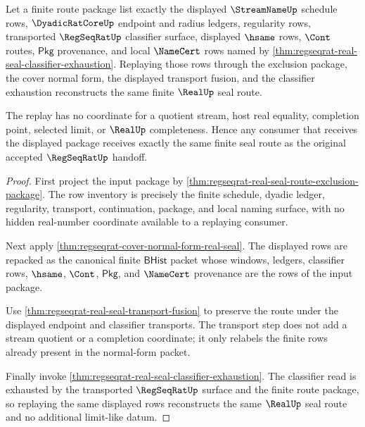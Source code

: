 \begin{theorem}
\label{thm:regseqrat-real-seal-route-replay}
Let a finite route package list exactly the displayed $\StreamNameUp$ schedule
rows, $\DyadicRatCoreUp$ endpoint and radius ledgers, regularity rows,
transported $\RegSeqRatUp$ classifier surface, displayed $\hsame$ rows,
$\Cont$ routes, $\mathsf{Pkg}$ provenance, and local $\NameCert$ rows named by
\autoref{thm:regseqrat-real-seal-classifier-exhaustion}. Replaying those rows
through the exclusion package, the cover normal form, the displayed transport
fusion, and the classifier exhaustion reconstructs the same finite $\RealUp$
seal route.

The replay has no coordinate for a quotient stream, host real equality,
completion point, selected limit, or $\RealUp$ completeness. Hence any
consumer that receives the displayed package receives exactly the same
finite seal route as the original accepted $\RegSeqRatUp$ handoff.
\end{theorem}
\begin{proof}
First project the input package by
\autoref{thm:regseqrat-real-seal-route-exclusion-package}. The row inventory
is precisely the finite schedule, dyadic ledger, regularity, transport,
continuation, package, and local naming surface, with no hidden real-number
coordinate available to a replaying consumer.

Next apply \autoref{thm:regseqrat-cover-normal-form-real-seal}. The displayed
rows are repacked as the canonical finite $\mathsf{BHist}$ packet whose
windows, ledgers, classifier rows, $\hsame$, $\Cont$, $\mathsf{Pkg}$, and
$\NameCert$ provenance are the rows of the input package.

Use \autoref{thm:regseqrat-real-seal-transport-fusion} to preserve the route
under the displayed endpoint and classifier transports. The transport step
does not add a stream quotient or a completion coordinate; it only relabels
the finite rows already present in the normal-form packet.

Finally invoke
\autoref{thm:regseqrat-real-seal-classifier-exhaustion}. The classifier read
is exhausted by the transported $\RegSeqRatUp$ surface and the finite route
package, so replaying the same displayed rows reconstructs the same
$\RealUp$ seal route and no additional limit-like datum.
\end{proof}


